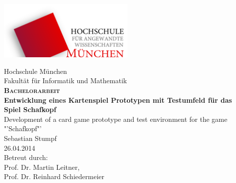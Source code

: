 \graphicspath{{pictures/}}
\begin{titlepage}	
		
	\begin{minipage}[b]{1.0\textwidth}
		\centering
		\includegraphics[width=0.5\textwidth]{hm_logo_svg.pdf}
		\vspace*{0.6cm}
	\end{minipage}
	
	\begin{minipage}{1.0\textwidth} 
		\centering	
		{\Large Hochschule München}\\[0.5cm]
		{\Large Fakultät für Informatik und Mathematik}\\[1.0cm]
		\textsc{\sffamily \LARGE \bfseries Bachelorarbeit}\\[1.0cm]
		{\sffamily \LARGE \bfseries Entwicklung eines Kartenspiel Prototypen mit Testumfeld für das Spiel Schafkopf}\\[1.0cm]	
		{\sffamily \LARGE Development of a card game prototype and test environment for the game "'Schafkopf"'}\\[2.0cm]	
		{\Large Sebastian Stumpf}\\[0.5cm]
		{\Large 26.04.2014}\\[2cm]
		{\Large Betreut durch:}\\[0.5cm]
		{\Large Prof. Dr. Martin Leitner,}\\[0.5cm]
		{\Large Prof. Dr. Reinhard Schiedermeier}\\[0.5cm]
	\end{minipage}
	
\end{titlepage}
